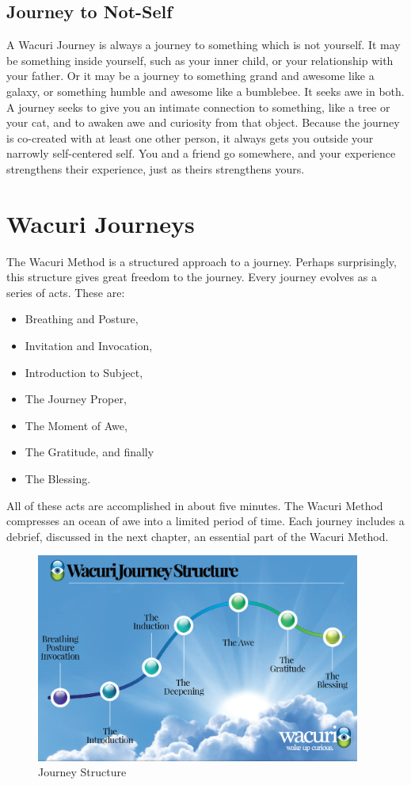 \documentclass[12pt]{book}
\begin{document}
\section{Journey to Not-Self}

A Wacuri Journey is always a journey to something which is not yourself.
It may be something inside yourself, such as your inner child, or your relationship with your father.
Or it may be a journey to something grand and awesome like a galaxy, or something humble and awesome like a bumblebee.
It seeks awe in both. A journey seeks to give you an intimate connection to something, like a tree or your cat,
and to awaken awe and curiosity from that object. Because the journey is co-created with at least one other person,
it always gets you outside your narrowly self-centered self.
You and a friend go somewhere, and your experience strengthens their experience, just as theirs strengthens yours.
				
\chapter{Wacuri Journeys}

The Wacuri Method is a structured approach to a journey. Perhaps
surprisingly, this structure gives great freedom to the journey.
Every journey evolves as a series of acts.
These are:
\begin{itemize}
\item Breathing and Posture,
\item Invitation and Invocation,
\item Introduction to Subject,
\item The Journey Proper,
\item The Moment of Awe,
\item The Gratitude, and finally
  \item The  Blessing.
\end{itemize}

All of these acts are accomplished in about five minutes. The Wacuri Method compresses an ocean of awe into a limited period of time. Each journey includes a debrief, discussed in the next chapter, an essential part of the Wacuri Method.


\begin{figure}
  \centering
     \includegraphics[width=0.95\textwidth]{WacuriFigures/Wacuri-Journey-Structure3.png}
     \caption{Journey Structure}
  \label{fig:journey}     
\end{figure}
\end{document}

